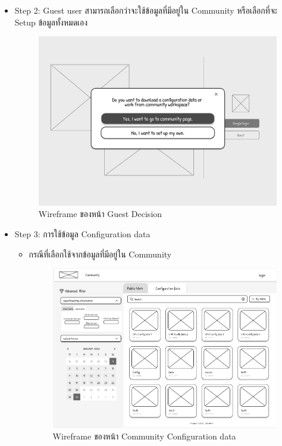 \begin{mypara}
\begin{itemize}
    \item Step 2: Guest user สามารถเลือกว่าจะใช้ข้อมูลที่มีอยู่ใน Community หรือเลือกที่จะ Setup ข้อมูลทั้งหมดเอง
      \begin{figure}[H]
        \centering
        \includegraphics[scale=0.35]
        {guest_login.png}
        \caption{Wireframe ของหน้า Guest Decision}
        \label{fig:WireframeGuestDecision}
      \end{figure}

    \item Step 3: การใช้ข้อมูล Configuration data
    \begin{itemize}
        \item กรณีที่เลือกใช้จากข้อมูลที่มีอยู่ใน Community
          \begin{figure}[H]
            \centering
            \includegraphics[scale=0.4]{conf_commu_guest.png}
            \caption{Wireframe ของหน้า Community Configuration data}
            \label{fig:WireframeCommunityConfigGuest}
          \end{figure}


\end{itemize}
\end{itemize}
\end{mypara}
